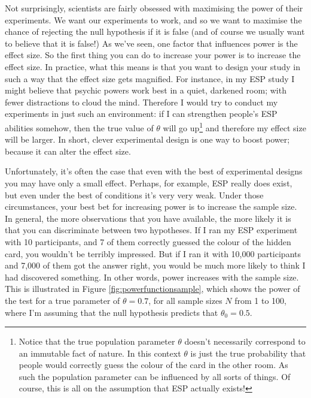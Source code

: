 \documentclass[
]{book}
\begin{document}
Not surprisingly, scientists are fairly obsessed with maximising the power of their experiments. We want our experiments to work, and so we want to maximise the chance of rejecting the null hypothesis if it is false (and of course we usually want to believe that it is false!) As we've seen, one factor that influences power is the effect size. So the first thing you can do to increase your power is to increase the effect size. In practice, what this means is that you want to design your study in such a way that the effect size gets magnified. For instance, in my ESP study I might believe that psychic powers work best in a quiet, darkened room; with fewer distractions to cloud the mind. Therefore I would try to conduct my experiments in just such an environment: if I can strengthen people's ESP abilities somehow, then the true value of \(\theta\) will go up\footnote{Notice that the true population parameter \(\theta\) doesn't necessarily correspond to an immutable fact of nature. In this context \(\theta\) is just the true probability that people would correctly guess the colour of the card in the other room. As such the population parameter can be influenced by all sorts of things. Of course, this is all on the assumption that ESP actually exists!} and therefore my effect size will be larger. In short, clever experimental design is one way to boost power; because it can alter the effect size.

Unfortunately, it's often the case that even with the best of experimental designs you may have only a small effect. Perhaps, for example, ESP really does exist, but even under the best of conditions it's very very weak. Under those circumstances, your best bet for increasing power is to increase the sample size. In general, the more observations that you have available, the more likely it is that you can discriminate between two hypotheses. If I ran my ESP experiment with 10 participants, and 7 of them correctly guessed the colour of the hidden card, you wouldn't be terribly impressed. But if I ran it with 10,000 participants and 7,000 of them got the answer right, you would be much more likely to think I had discovered something. In other words, power increases with the sample size. This is illustrated in Figure \ref{fig:powerfunctionsample}, which shows the power of the test for a true parameter of \(\theta = 0.7\), for all sample sizes \(N\) from 1 to 100, where I'm assuming that the null hypothesis predicts that \(\theta_0 = 0.5\).
\end{document}

